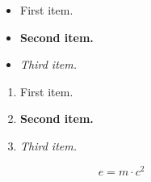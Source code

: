 \documentclass[orientation=landscape,size=a1,scale=1.2]{tuos-poster}
\begin{document}
\begin{frame}[t]
\begin{columns}[t]
\begin{column}{.31\textwidth}
    \end{column}
%
    \begin{column}{.31\textwidth}
      \begin{Example}
         \begin{itemize}
           \item \alert{First item.}
           \item \textbf{Second item.}
           \item \emph{Third item.}
         \end{itemize}
      \end{Example}
      \begin{Example}
         \begin{enumerate}
           \item \alert{First item.}
           \item \textbf{Second item.}
           \item \emph{Third item.}
         \end{enumerate}
      \end{Example}
      \begin{Example}
        \[ e = m \cdot c^2 \]
      \end{Example}
    \end{column}
%
    \end{columns}
\end{frame}
\end{document}
